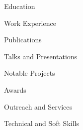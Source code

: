 \documentclass{resume} %
\begin{document}


\begin{rSection}{\sc Education}
    
    
    
\end{rSection}

\vspace*{0.5\baselineskip} 
\begin{rSection}{\sc Work Experience}
    
    
    
    
\end{rSection}

\vspace*{0.5\baselineskip} 
\begin{rSection}{\sc Publications}
    
\end{rSection}

\vspace*{0.5\baselineskip} 
\begin{rSection}{\sc Talks and Presentations}
    
\end{rSection}

\vspace*{0.5\baselineskip} 
\begin{rSection}{\sc Notable Projects}
    
    
    
    
    
\end{rSection}

\vspace*{0.5\baselineskip} 
\begin{rSection}{\sc Awards}
    
\end{rSection}

\vspace*{0.5\baselineskip} 
\begin{rSection}{\sc Outreach and Services}
    
\end{rSection}

\vspace*{0.5\baselineskip} 
\begin{rSection}{\sc Technical and Soft Skills}
    
\end{rSection}

\pagestyle{fancy}
\fancyfoot{}
\cfoot{\thepage} %
\end{document}
